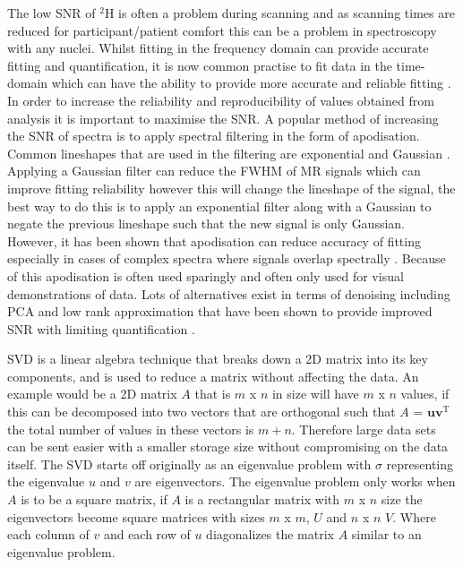 The low \ac{SNR} of $^2$H is often a problem during scanning and as scanning times are reduced for participant/patient comfort this can be a problem in spectroscopy with any nuclei. Whilst fitting in the frequency domain can provide accurate fitting and quantification, it is now common practise to fit data in the time-domain which can have the ability to provide more accurate and reliable fitting \cite{Joliot1991InMethods}. In order to increase the reliability and reproducibility of values obtained from analysis it is important to maximise the \ac{SNR}. A popular method of increasing the \ac{SNR} of spectra is to apply spectral filtering in the form of apodisation. Common lineshapes that are used in the filtering are exponential and Gaussian \cite{Goryawala2020EffectsFitting}. Applying a Gaussian filter can reduce the \ac{FWHM} of MR signals which can improve fitting reliability however this will change the lineshape of the signal, the best way to do this is to apply an exponential filter along with a Gaussian to negate the previous lineshape such that the new signal is only Gaussian. However, it has been shown that apodisation can reduce accuracy of fitting especially in cases of complex spectra where signals overlap spectrally \cite{Bartha1999FactorsFiltering}. Because of this apodisation is often used sparingly and often only used for visual demonstrations of data. Lots of alternatives exist in terms of denoising including \ac{PCA} \cite{Abdoli2016DenoisingComponents} and low rank approximation \cite{Nguyen2013DenoisingApproximations} that have been shown to provide improved \ac{SNR} with limiting quantification \cite{Clarke2022UncertaintyMethods}. 

\ac{SVD} is a linear algebra technique that breaks down a 2D matrix into its key components, and is used to reduce a matrix without affecting the data. An example would be a 2D matrix $A$ that is $m$ x $n$ in size will have $m$ x $n$ values, if this can be decomposed into two vectors that are orthogonal such that $A$ = $\mathbf{uv}^\textrm{T}$ the total number of values in these vectors is $m+n$. Therefore large data sets can be sent easier with a smaller storage size without compromising on the data itself. The \ac{SVD} starts off originally as an eigenvalue problem with $\sigma$ representing the eigenvalue $u$ and $v$ are eigenvectors. The eigenvalue problem only works when $A$ is to be a square matrix, if $A$ is a rectangular matrix with $m$ x $n$ size the eigenvectors become square matrices with sizes $m$ x $m$, $U$ and $n$ x $n$ $V$. Where each column of $v$ and each row of $u$ diagonalizes the matrix $A$ similar to an eigenvalue problem.

